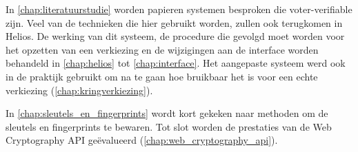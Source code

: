 \npar In \ref{chap:literatuurstudie} worden papieren systemen besproken die voter-verifiable zijn. Veel van de technieken die hier gebruikt worden, zullen ook terugkomen in Helios. De werking van dit systeem, de procedure die gevolgd moet worden voor het opzetten van een verkiezing en de wijzigingen aan de interface worden behandeld in \ref{chap:helios} tot \ref{chap:interface}. Het aangepaste systeem werd ook in de praktijk gebruikt om na te gaan hoe bruikbaar het is voor een echte verkiezing (\ref{chap:kringverkiezing}). 

\npar In \ref{chap:sleutels_en_fingerprints} wordt kort gekeken naar methoden om de sleutels en fingerprints te bewaren. Tot slot worden de prestaties van de Web Cryptography API ge\"evalueerd (\ref{chap:web_cryptography_api}).
